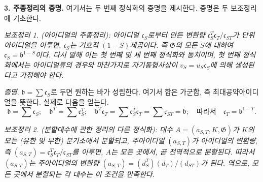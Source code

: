 \noindent\textbf{3. 주종정리의 증명.} 여기서는 두 번째 정식화의 증명을 제시한다. 증명은 두 보조정리에 기초한다.

\emph{보조정리 1. (아이디얼의 주종정리): 아이디얼 \(\mathfrak c_S\)로부터 만든 변환량 \(\mathfrak c_S^T\mathfrak c_T/\mathfrak c_{ST}\)가 단위아이디얼을 이루면, \(\mathfrak c_S\)는 기호적 \((1-S)\)제곱이다. 즉 \(\mathfrak G\)의 모든 \(S\)에 대하여 \(\mathfrak c_S=\mathfrak b^{1-S}\)이다. 다시 말해 이는 첫 번째 및 세 번째 정식화와 동치이며, 첫 번째 정식화에서는 아이디얼류의 경우와 마찬가지로 자기동형사상이 \(v_S=u_S\mathfrak c_S\)에 의해 생성된다고 가정해야 한다.}

\emph{증명}. \(\mathfrak b=\sum\mathfrak c_S\)로 두면 원하는 바가 성립한다. 여기서 합은 가군합, 즉 최대공약아이디얼을 뜻한다. 실제로 다음을 얻는다.
\[
\mathfrak b=\sum\mathfrak c_S;\quad
\mathfrak b^T=\sum\mathfrak c_S^T;\quad
\mathfrak b^T\mathfrak c_T=\sum\mathfrak c_S^T\mathfrak c_T
=\sum\mathfrak c_{ST}=\mathfrak b;\quad
\text{따라서}\quad\mathfrak c_T=\mathfrak b^{1-T}.
\]

\emph{보조정리 2. (분할대수에 관한 정리의 다른 정식화): 대수 \(A=(a_{S,T},K,\mathfrak G)\)가 \(K\)의 모든 (유한 및 무한) 분기소에서 분할되고, 주아이디얼 \((a_{S,T})\)가 아이디얼의 변환량, 즉 \((a_{S,T})=\mathfrak c_S^T\mathfrak c_T/\mathfrak c_{ST}\)를 이루면, \(A\)는 모든 곳에서, 곧 전역적으로 분할된다. 따라서 \((a_{S,T})\)는 주아이디얼의 변환량 \((a_{S,T})=(d_S^T)(d_T)/(d_{ST})\)가 된다. 역으로, 모든 곳에서 분할되는 각 대수는 이 조건을 만족한다.}

